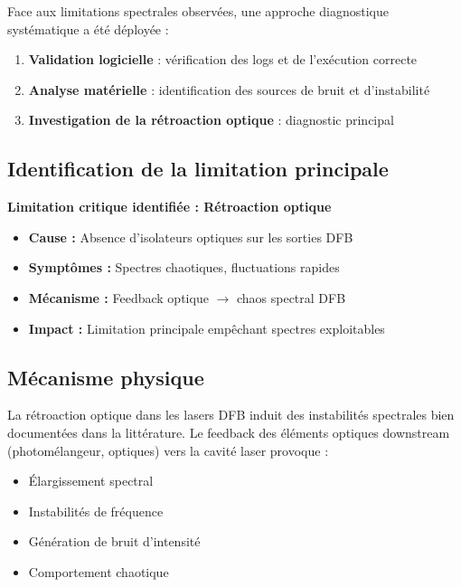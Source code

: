 Face aux limitations spectrales observées, une approche diagnostique systématique a été déployée :

\begin{enumerate}
    \item \textbf{Validation logicielle} : vérification des logs et de l'exécution correcte
    \item \textbf{Analyse matérielle} : identification des sources de bruit et d'instabilité
    \item \textbf{Investigation de la rétroaction optique} : diagnostic principal
\end{enumerate}

\subsection{Identification de la limitation principale}

\begin{keyresult}
\textbf{Limitation critique identifiée : Rétroaction optique}
\begin{itemize}
    \item \textbf{Cause :} Absence d'isolateurs optiques sur les sorties DFB
    \item \textbf{Symptômes :} Spectres chaotiques, fluctuations rapides
    \item \textbf{Mécanisme :} Feedback optique $\rightarrow$ chaos spectral DFB
    \item \textbf{Impact :} Limitation principale empêchant spectres exploitables
\end{itemize}
\end{keyresult}

\subsection{Mécanisme physique}

La rétroaction optique dans les lasers DFB induit des instabilités spectrales bien documentées dans la littérature. Le feedback des éléments optiques downstream (photomélangeur, optiques) vers la cavité laser provoque :
\begin{itemize}
    \item Élargissement spectral
    \item Instabilités de fréquence
    \item Génération de bruit d'intensité
    \item Comportement chaotique
\end{itemize}

